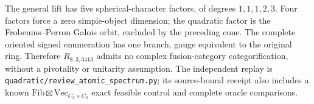 The general lift has five spherical-character factors, of degrees
$1,1,1,2,3$. Four factors force a zero simple-object dimension; the
quadratic factor is the Frobenius--Perron Galois orbit, excluded by the
preceding cone. The complete oriented signed enumeration has one
branch, gauge equivalent to the original ring. Therefore
$R_{8,3,3413}$ admits no complex fusion-category categorification,
without a pivotality or unitarity assumption. The independent replay
is \texttt{quadratic/review\_atomic\_spectrum.py}; its source-bound
receipt also includes a known $\mathrm{Fib}\boxtimes\mathrm{Vec}_{C_2\times C_2}$
exact feasible control and complete oracle comparisons.
